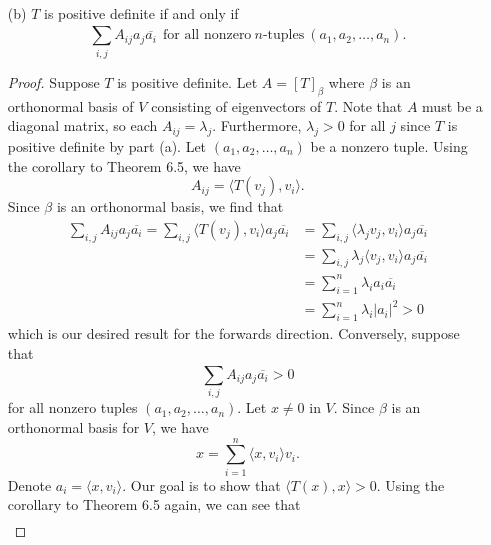 \begin{enumerate}
\begin{proof}
        \end{proof}
    \item[(b)] \( T  \) is positive definite if and only if 
        \[ \sum_{ i,j }^{  } {A}_{ij} {a}_{j} \overline{{a}_{i} } \ \ \text{for all nonzero} \ n  \text{-tuples} \  ({a}_{1}, {a}_{2}, \dots, {a}_{n}).  \]
        \begin{proof}
        Suppose \( T  \) is positive definite. Let \( A = [T]_{\beta} \) where \( \beta  \) is an orthonormal basis of \( V  \) consisting of eigenvectors of \( T  \). Note that \( A  \) must be a diagonal matrix, so each \( {A}_{ij} = {\lambda}_{j} \). Furthermore, \( \lambda_j > 0  \) for all \( j  \) since \( T  \) is positive definite by part (a). Let \( ({a}_{1}, {a}_{2}, \dots, {a}_{n}) \) be a nonzero tuple. Using the corollary to Theorem 6.5, we have 
        \[  {A}_{ij} = \langle T({v}_{j}) , {v}_{i} \rangle. \]
        Since \( \beta  \) is an orthonormal basis, we find that
        \begin{align*}
           \sum_{ i,j }^{  } {A}_{ij} {a}_{j} \overline{{a}_{i}} = \sum_{ i,j }^{  } \langle T({v}_{j}) , {v}_{i}  \rangle {a}_{j} \overline{{a}_{i}} 
                                                                 &= \sum_{ i,j  }^{  } \langle {\lambda}_{j} {v}_{j} , {v}_{i}  \rangle {a}_{j} \overline{{a}_{i}} \\
                                                                 &= \sum_{ i,j  }^{  } {\lambda}_{j} \langle {v}_{j} , {v}_{i} \rangle {a}_{j} \overline{{a}_{i}} \\
                                                                 &= \sum_{ i=1  }^{ n } {\lambda}_{i} {a}_{i} \overline{{a}_{i}} \\ 
                                                                 &= \sum_{ i=1  }^{ n } {\lambda}_{i} | {a}_{i} |^{2} > 0
        \end{align*}
        which is our desired result for the forwards direction. Conversely, suppose that 
        \[ \sum_{ i,j }^{  } {A}_{ij} {a}_{j} \overline{{a}_{i}} > 0   \]
        for all nonzero tuples \( ({a}_{1}, {a}_{2}, \dots, {a}_{n})  \). Let \( x \neq 0  \) in \( V  \). Since \( \beta  \) is an orthonormal basis for \( V  \), we have 
        \[  x = \sum_{ i=1  }^{ n } \langle x , {v}_{i} \rangle {v}_{i}. \]
        Denote \( {a}_{i} = \langle x  , {v}_{i}  \rangle \). Our goal is to show that \( \langle T(x) , x \rangle > 0  \). Using the corollary to Theorem 6.5 again, we can see that
        \begin{align*}

\end{align*}
\end{proof}
\end{enumerate}
